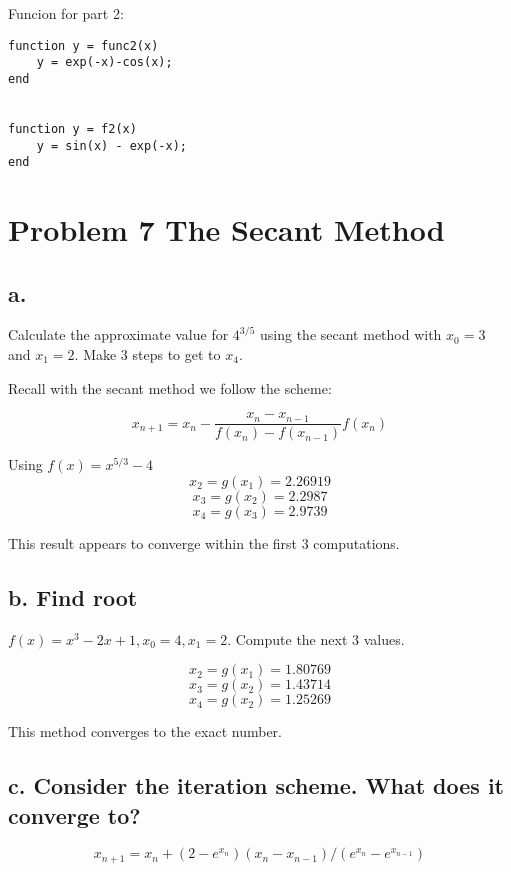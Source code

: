\documentclass[]{article}
\begin{document}
Funcion for part 2:

\begin{verbatim}
function y = func2(x)
    y = exp(-x)-cos(x);
end


function y = f2(x)
    y = sin(x) - exp(-x);
end
\end{verbatim}

\hypertarget{problem-7-the-secant-method}{%
\section{Problem 7 The Secant
Method}\label{problem-7-the-secant-method}}

\hypertarget{a.}{%
\subsection{a.}\label{a.}}

Calculate the approximate value for \(4^{3/5}\) using the secant method
with \(x_0 = 3\) and \(x_1 = 2\). Make 3 steps to get to \(x_4\).

Recall with the secant method we follow the scheme:

\[x_{n+1} = x_n - \frac{x_n - x_{n-1}}{f(x_n)-f(x_{n-1})}f(x_n)\]

Using \(f(x) = x^{5/3}-4\) \[x_2 = g(x_1) = 2.26919\]
\[x_3 = g(x_2) = 2.2987\] \[x_4 = g(x_3) = 2.9739\]

This result appears to converge within the first 3 computations.

\hypertarget{b.-find-root}{%
\subsection{b. Find root}\label{b.-find-root}}

\(f(x) = x^3 -2x + 1, x_0 = 4, x_1 = 2\). Compute the next 3 values.

\[x_2 = g(x_1) = 1.80769\] \[x_3 = g(x_2) = 1.43714\]
\[x_4 = g(x_2) = 1.25269\]

This method converges to the exact number.

\hypertarget{c.-consider-the-iteration-scheme.-what-does-it-converge-to}{%
\subsection{c. Consider the iteration scheme. What does it converge
to?}\label{c.-consider-the-iteration-scheme.-what-does-it-converge-to}}

\[x_{n+1} = x_n + (2-e^{x_n})(x_n-x_{n-1})/(e^{x_n}-e^{x_{n-1}})\]
\end{document}
